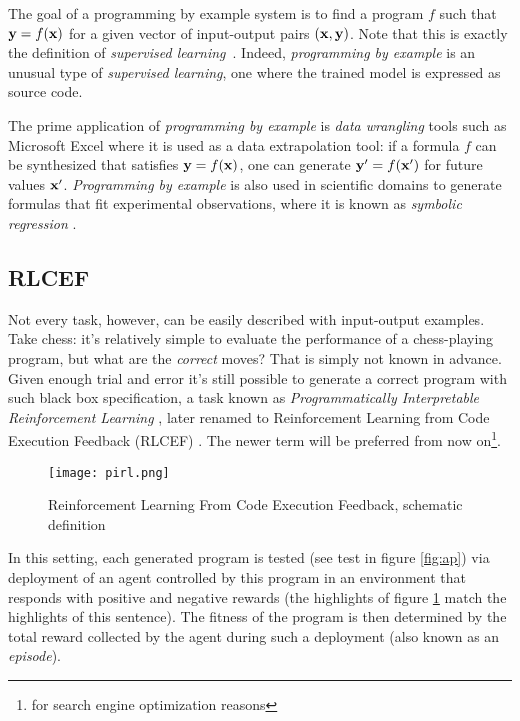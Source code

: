 The goal of a programming by example system is to find a program $f$ such that $\mathbf{y}=f(\mathbf{x})$ for a given vector of input-output pairs $(\mathbf{x},\mathbf{y})$. 
Note that this is exactly the definition of \emph{supervised learning}~\cite{cunninghamSupervisedLearning2008}.
Indeed, \emph{programming by example} is an unusual type of \emph{supervised learning}, one where the trained model is expressed as source code.

The prime application of \emph{programming by example} is \emph{data wrangling} tools such as Microsoft Excel \cite{gulwani2016:programming} where it is used as a data extrapolation tool: if a formula $f$ can be synthesized that satisfies $\mathbf{y}=f(\mathbf{x})$, one can generate $\mathbf{y} '=f(\mathbf{x} ')$ for future values $\mathbf{x} '$.
\emph{Programming by example} is also used in scientific domains to generate formulas that fit experimental observations, where it is known as \emph{symbolic regression} \cite{makkeInterpretableScientificDiscovery2022}.

\subsection{RLCEF}
\label{sec:rlcef}

Not every task, however, can be easily described with input-output examples. 
Take chess: it's relatively simple to evaluate the performance of a chess-playing program, but what are the \emph{correct} moves? 
That is simply not known in advance.
Given enough trial and error it's still possible to generate a correct program with such black box specification, a task known as \emph{Programmatically Interpretable Reinforcement Learning} \cite{pirl}, later renamed to Reinforcement Learning from Code Execution Feedback (RLCEF) \cite{douStepCoderImproveCode2024, gehringRLEFGroundingCode2025, liuRLTFReinforcementLearning2023, PoolsideAnnouncingOur, shojaeeExecutionbasedCodeGeneration2023, yangIntercodeStandardizingBenchmarking2023}.
The newer term will be preferred from now on\footnote{for search engine optimization reasons}.

\begin{figure}
    \centering
    \texttt{[image: pirl.png]}
    \caption{Reinforcement Learning From Code Execution Feedback, schematic definition}
    \label{fig:RLCEF}
\end{figure}

In this setting, each generated program is tested (see \textcolor{accent}{test} in figure \ref{fig:ap}) via deployment of an \textcolor{accent}{agent} controlled by this program in an environment that responds with positive and negative \textcolor{accent}{rewards} (the highlights of figure \ref{fig:RLCEF} match the highlights of this sentence).
The fitness of the program is then determined by the total reward collected by the agent during such a deployment (also known as an \emph{episode}).

